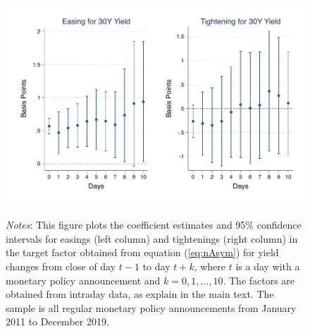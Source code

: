 \documentclass{article}
\begin{document}
\begin{figure}[tbph]
\begin{center}
		\includegraphics[trim={0.6cm 0cm 0.5cm 0cm},clip,height=.2\textheight,width=1\textwidth]{persistasytrggmxn30yr} \\
	\end{center}
	
	\vspace{-0.4cm} \caption*{\footnotesize{\textit{Notes}: This figure plots the coefficient estimates and 95\% confidence intervals for easings (left column) and tightenings (right column) in the target factor obtained from equation (\ref{eq:nAsym}) for yield changes from close of day \(t - 1\) to day \(t + k\), where \(t\) is a day with a monetary policy announcement and \(k = 0, 1, \ldots, 10\). The factors are obtained from intraday data, as explain in the main text. The sample is all regular monetary policy announcements from January 2011 to December 2019.}}
\end{figure}


%	
%	
\end{document}
